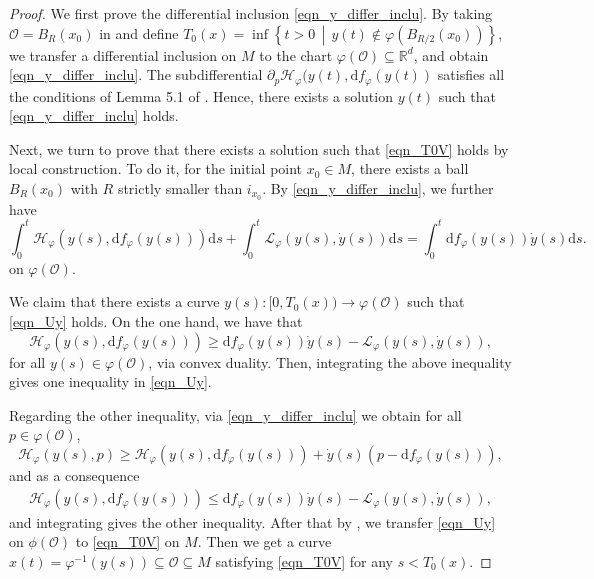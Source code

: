 \documentclass[a4paper]{article}
\numberwithin{equation}{section}
\theoremstyle{definition}
\begin{document}
\begin{proof}
	We first prove the differential inclusion \eqref{eqn_y_differ_inclu}. By taking $\mathcal{O}=B_{R}(x_0)$ in  and define $T_0(x) = \inf \left\{ t > 0 \, \middle| \, y(t) \notin \varphi(B_{R/2}(x_0)) \right\}$, we transfer a differential inclusion on $M$ to the chart $\varphi(\mathcal{O})\subseteq \mathbb{R}^d$, and obtain \eqref{eqn_y_differ_inclu}. The subdifferential $\partial_p\mathcal{H}_\varphi(y(t),\mathrm{d}f_\varphi(y(t))$ satisfies all the conditions of Lemma 5.1 of \cite{D1992MR1189795}. Hence, there exists a solution $y(t)$ such that \eqref{eqn_y_differ_inclu} holds.
	\par
	Next, we turn to prove that there exists a solution such that \eqref{eqn_T0V} holds by local construction. To do it, for the initial point $x_0\in M$, there exists a ball $B_{R}(x_0)$ with $R$ strictly smaller than   $i_{x_0}$. By \eqref{eqn_y_differ_inclu}, we further have
\begin{equation}\label{eqn_Uy}
\int^t_0\mathcal{H}_{\varphi}(y(s),\mathrm{d} f_{\varphi}(y(s)))\mathrm{d}s+\int^t_0\mathcal{L}_{\varphi}(y(s),\dot{y}(s))\mathrm{d}s=\int^t_0\mathrm{d}f_{\varphi}(y(s))\dot{y}(s)\mathrm{d}s.
	\end{equation}
 on $\varphi(\mathcal{O})$.
 \par
 We claim that there exists a curve $y(s):[0,T_0(x))\to \varphi(\mathcal{O})$ such that \eqref{eqn_Uy} holds. 
  On the one hand, we have that
		\begin{equation*}
			\mathcal{H}_\varphi(y(s),\mathrm{d}f_{\varphi}(y(s) ))\geq \mathrm{d}f_{\varphi}(y(s))\dot{y}(s)-\mathcal{L}_\varphi(y(s),\dot{y}(s)),
	\end{equation*}
	for all $y(s)\in \varphi(\mathcal{O})$, via convex duality.
Then, integrating the above inequality gives one inequality in \eqref{eqn_Uy}.
\par Regarding the other inequality, via \eqref{eqn_y_differ_inclu} we obtain for all $p\in \varphi(\mathcal{O})$, 
\begin{equation*}
	\mathcal{H}_\varphi (y(s),p)\geq \mathcal{H}_\varphi(y(s),\mathrm{d}f_{\varphi}(y(s) ))+ \dot{y}(s) \left(p- \mathrm{d}f_{\varphi}(y(s))\right),
\end{equation*}
and as a consequence
\begin{align*}
\mathcal{H}_\varphi(y(s),\mathrm{d}f_{\varphi}(y(s) ))\leq \mathrm{d}f_{\varphi}(y(s))\dot{y}(s)-\mathcal{L}_\varphi(y(s),\dot{y}(s)),
\end{align*}
and integrating gives the other inequality.
After that by , we transfer \eqref{eqn_Uy} on $\phi(\mathcal{O})$ to \eqref{eqn_T0V} on $M$. Then we get a curve $x(t)=\varphi^{-1}(y(s))\subseteq \mathcal{O}\subseteq M$ satisfying \eqref{eqn_T0V} for any $s < T_0(x)$. 
\end{proof}
\end{document}
